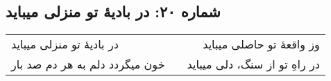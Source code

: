 \begin{center}
\section*{شماره ۲۰: در بادیۀ تو منزلی میباید}
\label{sec:020}
\begin{longtable}{l p{0.5cm} r}
در بادیهٔ تو منزلی میباید
&&
وز واقعهٔ تو حاصلی میباید
\\
خون میگردد دلم به هر دم صد بار
&&
در راهِ تو از سنگ، دلی میباید
\\
\end{longtable}
\end{center}
